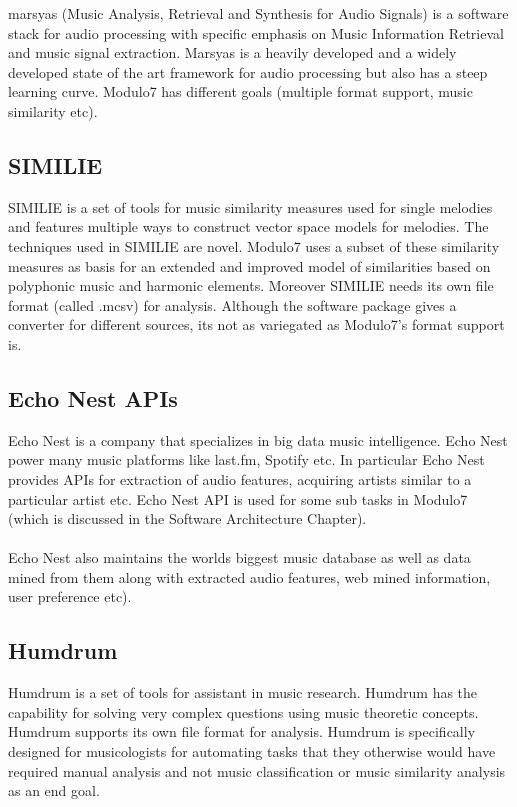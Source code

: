 \noindent marsyas \cite{marsyas} (Music Analysis, Retrieval and Synthesis for Audio Signals) is a software stack for audio processing with specific emphasis on Music Information Retrieval and music signal extraction. Marsyas is a heavily developed and a widely developed state of the art framework for audio processing but also has a steep learning curve. Modulo7 has different goals (multiple format support, music similarity etc). 

\subsection{SIMILIE}

\noindent SIMILIE \cite{similie} is a set of tools for music similarity measures used for single  melodies and features multiple ways to construct vector space models for melodies. The techniques used in SIMILIE are novel. Modulo7 uses a subset of these similarity measures as basis for an extended and improved model of similarities based on polyphonic music and harmonic elements. Moreover SIMILIE needs its own file format (called .mcsv) for analysis. Although the software package gives a converter for different sources, its not as variegated as Modulo7's format support is.

\subsection{Echo Nest APIs}

\noindent Echo Nest is a company that specializes in big data music intelligence. Echo Nest power many music platforms like last.fm, Spotify etc. In particular Echo Nest provides APIs for extraction of audio features, acquiring artists similar to a particular artist etc. Echo Nest API is used for some sub tasks in Modulo7 (which is discussed in the Software Architecture Chapter). \\\\
Echo Nest also maintains the worlds biggest music database as well as data mined from them along with extracted audio features, web mined information, user preference etc). 

\subsection{Humdrum}

\noindent Humdrum \cite{humdrum} is a set of tools for assistant in music research. Humdrum has the capability for solving very complex questions using music theoretic concepts. Humdrum supports its own file format for analysis. Humdrum is specifically designed for musicologists for automating tasks that they otherwise would have required manual analysis and not music classification or music similarity analysis as an end goal.


